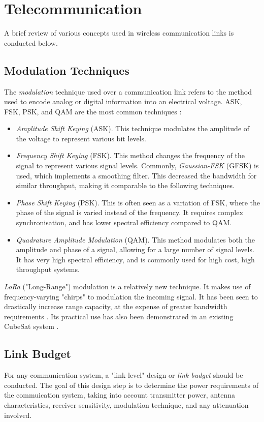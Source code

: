 \section{Telecommunication}\label{sec:telecommunication_theory}
A brief review of various concepts used in wireless communication links is conducted below.

\subsection{Modulation Techniques}
The \textit{modulation} technique used over a communication link refers to the method used to encode analog or digital information into an electrical voltage. ASK, FSK, PSK, and QAM are the most common techniques \cite{site-satelliteModulationOverview} \cite{site-satelliteModulationComparison}:
\begin{itemize}
    \item \textit{Amplitude Shift Keying} (ASK). This technique modulates the amplitude of the voltage to represent various bit levels.
    \item \textit{Frequency Shift Keying} (FSK). This method changes the frequency of the signal to represent various signal levels. Commonly, \textit{Gaussian-FSK} (GFSK) is used, which implements a smoothing filter. This decreased the bandwidth for similar throughput, making it comparable to the following techniques.
    \item \textit{Phase Shift Keying} (PSK). This is often seen as a variation of FSK, where the phase of the signal is varied instead of the frequency. It requires complex synchronisation, and has lower spectral efficiency compared to QAM.
    \item \textit{Quadrature Amplitude Modulation} (QAM). This method modulates both the amplitude and phase of a signal, allowing for a large number of signal levels. It has very high spectral efficiency, and is commonly used for high cost, high throughput systems.
\end{itemize}

\textit{LoRa} ("Long-Range") modulation is a relatively new technique. It makes use of frequency-varying "chirps" to modulation the incoming signal. It has been seen to drastically increase range capacity, at the expense of greater bandwidth requirements \cite{datasheet-SX1278}. Its practical use has also been demonstrated in an existing CubeSat system \cite{design-FOSSASATLink}.

\subsection{Link Budget}\label{sec:link_budget}
For any communication system, a "link-level" design or \textit{link budget} should be conducted. The goal of this design step is to determine the power requirements of the commuication system, taking into account transmitter power, antenna characteristics, receiver sensitivity, modulation technique, and any attenuation involved.

